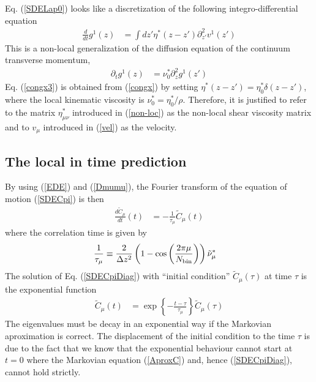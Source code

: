 \documentclass[a4paper,openright,12pt]{book}
\begin{document}
Eq. (\ref{SDELap0}) looks    like    a   discretization    of    the    following
integro-differential  equation
\begin{align}
  \frac{d}{dt} g^1(z)&=\int dz'{\eta}^*(z-z')\partial^2_{z'} v^1(z')
\label{congx}
\end{align}
This is  a non-local generalization  of the diffusion equation  of the
continuum transverse  momentum,
\begin{align}
  \partial_t g^1(z)&=\nu^*_0\partial^2_{z}g^1(z')
\label{congx3}
\end{align}
Eq.   (\ref{congx3})   is  obtained  from  (\ref{congx})   by  setting
$\eta^*(z-z')=\eta^*_0\delta(z-z')$,   where   the   local   kinematic
viscosity is  $\nu^*_0=\eta^*_0/\rho$.  Therefore, it is  justified to
refer to the matrix $\eta^*_{\mu\nu}$ introduced in (\ref{non-loc}) as
the  non-local shear  viscosity matrix  and to  $v_\mu$ introduced  in
(\ref{vel}) as the velocity.


\subsection{The local in time prediction}
By using (\ref{EDE})  and (\ref{Dmumu}), the Fourier  transform of the
equation of motion (\ref{SDECpi}) is then
\begin{align}
  \frac{d\tilde{C}_\mu}{dt}(t)&=-\frac{1}{\tau_\mu}\tilde{C}_\mu(t)  
\label{SDECpiDiag}
\end{align}
where the correlation time is given by 
\begin{align}
 \frac{1}{\tau_\mu}&\equiv \frac{2}{\Delta z^2}
\left(1-\cos\left( \frac{2\pi \mu}{N_{\rm bin}}\right)\right)
\tilde{\nu}_\mu^*
\label{taumu}
\end{align}
The  solution of  Eq.  (\ref{SDECpiDiag})  with ``initial  condition''
$\tilde{C}_\mu(\tau)$ at time $\tau$ is the exponential function
\begin{align}
  \tilde{C}_\mu(t)&=\exp\left\{-\frac{t-\tau}{\tau_\mu}\right\}  \tilde{C}_\mu(\tau)
\label{solexp}
\end{align}
The eigenvalues must be decay in an exponential way if the Markovian aproximation is correct. 
The displacement of the initial condition to the time $\tau$ is due to
the fact that  we know that the exponential behaviour  cannot start at
$t=0$  where   the  Markovian  equation  (\ref{AproxC})   and,  hence
(\ref{SDECpiDiag}), cannot hold strictly.
\end{document}
